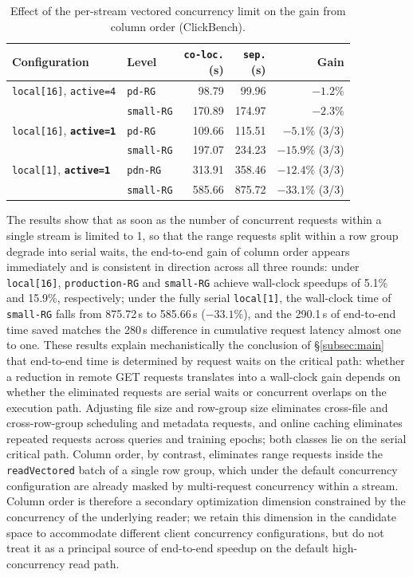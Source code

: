 \begin{table}[t]
\centering
\caption{Effect of the per-stream vectored concurrency limit on the gain from
column order (ClickBench).}
\label{tab:colorder_knob}
\footnotesize
\setlength{\tabcolsep}{3.5pt}
\begin{tabular}{@{}llrrr@{}}
\toprule
Configuration & Level & \makecell[r]{\texttt{co-loc.}\\(s)} &
\makecell[r]{\texttt{sep.}\\(s)} & Gain \\
\midrule
\texttt{local[16]}, \texttt{active=4}
  & \texttt{pd-RG} & 98.79  & 99.96  & $-1.2\%$ \\
  & \texttt{small-RG}      & 170.89 & 174.97 & $-2.3\%$ \\
\addlinespace[2pt]
\texttt{local[16]}, \textbf{\texttt{active=1}}
  & \texttt{pd-RG} & 109.66 & 115.51 & $\mathbf{-5.1\%}$ (3/3) \\
  & \texttt{small-RG}      & 197.07 & 234.23 & $\mathbf{-15.9\%}$ (3/3) \\
\addlinespace[2pt]
\texttt{local[1]}, \textbf{\texttt{active=1}}
  & \texttt{pdn-RG} & 313.91 & 358.46 & $\mathbf{-12.4\%}$ (3/3) \\
  & \texttt{small-RG}      & 585.66 & 875.72 & $\mathbf{-33.1\%}$ (3/3) \\
\bottomrule
\end{tabular}
\end{table}

The results show that as soon as the number of concurrent requests within a
single stream is limited to 1, so that the range requests split within a row
group degrade into serial waits, the end-to-end gain of column order appears
immediately and is consistent in direction across all three rounds: under
\texttt{local[16]}, \texttt{production-RG} and \texttt{small-RG} achieve
wall-clock speedups of 5.1\% and 15.9\%, respectively; under the fully serial
\texttt{local[1]}, the wall-clock time of \texttt{small-RG} falls from 875.72\,s
to 585.66\,s ($-33.1\%$), and the 290.1\,s of end-to-end time saved matches the
280\,s difference in cumulative request latency almost one to one. These results
explain mechanistically the conclusion of \S\ref{subsec:main} that end-to-end
time is determined by request waits on the critical path: whether a reduction in
remote GET requests translates into a wall-clock gain depends on whether the
eliminated requests are serial waits or concurrent overlaps on the execution
path. Adjusting file size and row-group size eliminates cross-file and
cross-row-group scheduling and metadata requests, and online caching eliminates
repeated requests across queries and training epochs; both classes lie on the
serial critical path. Column order, by contrast, eliminates range requests
inside the \texttt{readVectored} batch of a single row group, which under the
default concurrency configuration are already masked by multi-request
concurrency within a stream. Column order is therefore a secondary optimization
dimension constrained by the concurrency of the underlying reader; we retain this
dimension in the candidate space to accommodate different client concurrency
configurations, but do not treat it as a principal source of end-to-end speedup
on the default high-concurrency read path.

